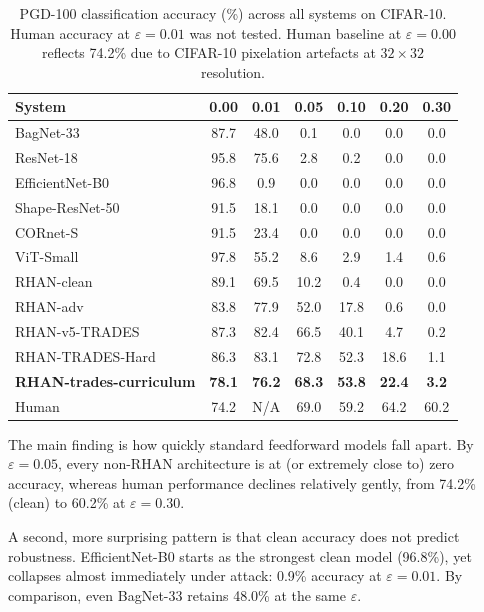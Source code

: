 \documentclass[12pt,a4paper]{article}
\begin{document}
\begin{table}[H]
\centering
\caption{PGD-100 classification accuracy (\%) across all systems on
CIFAR-10. Human accuracy at $\varepsilon{=}0.01$ was not tested.
Human baseline at $\varepsilon{=}0.00$ reflects 74.2\% due to
CIFAR-10 pixelation artefacts at $32{\times}32$ resolution.}
\label{tab:pgd_accuracy}
\renewcommand{\arraystretch}{1.25}
\begin{tabularx}{\textwidth}{lCCCCCC}
\toprule
\textbf{System} &
\textbf{0.00} & \textbf{0.01} & \textbf{0.05} &
\textbf{0.10} & \textbf{0.20} & \textbf{0.30} \\
\midrule
BagNet-33        & 87.7 & 48.0 & 0.1  & 0.0  & 0.0  & 0.0  \\
ResNet-18        & 95.8 & 75.6 & 2.8  & 0.2  & 0.0  & 0.0  \\
EfficientNet-B0  & 96.8 & 0.9  & 0.0  & 0.0  & 0.0  & 0.0  \\
Shape-ResNet-50  & 91.5 & 18.1 & 0.0  & 0.0  & 0.0  & 0.0  \\
CORnet-S         & 91.5 & 23.4 & 0.0  & 0.0  & 0.0  & 0.0  \\
ViT-Small        & 97.8 & 55.2 & 8.6  & 2.9  & 1.4  & 0.6  \\
\midrule
RHAN-clean       & 89.1 & 69.5 & 10.2 & 0.4  & 0.0  & 0.0  \\
RHAN-adv         & 83.8 & 77.9 & 52.0 & 17.8 & 0.6  & 0.0  \\
RHAN-v5-TRADES   & 87.3 & 82.4 & 66.5 & 40.1 & 4.7  & 0.2  \\
RHAN-TRADES-Hard & 86.3 & 83.1 & 72.8 & 52.3 & 18.6 & 1.1  \\
\textbf{RHAN-trades-curriculum}& \textbf{78.1} & \textbf{76.2} & \textbf{68.3} &
                   \textbf{53.8} & \textbf{22.4} & \textbf{3.2}  \\
\midrule
Human            & 74.2 & N/A  & 69.0 & 59.2 & 64.2 & 60.2 \\
\bottomrule
\end{tabularx}
\end{table}

The main finding is how quickly standard feedforward models fall apart.
By $\varepsilon{=}0.05$, every non-RHAN architecture is at (or extremely
close to) zero accuracy, whereas human performance declines relatively
gently, from 74.2\% (clean) to 60.2\% at $\varepsilon{=}0.30$.

A second, more surprising pattern is that clean accuracy does not predict
robustness. EfficientNet-B0 starts as the strongest clean model (96.8\%),
yet collapses almost immediately under attack: 0.9\% accuracy at
$\varepsilon{=}0.01$. By comparison, even BagNet-33 retains 48.0\% at the
same $\varepsilon$.
\end{document}
